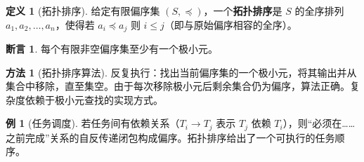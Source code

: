 \documentclass[UTF8,11pt,a4paper]{ctexbook}   %
\theoremstyle{definition}
\newtheorem{definition}{定义}[section]
\newtheorem{example}{例}[section]
\newtheorem{method}{方法}[section]
\newtheorem{proposition}{断言}[section]
\begin{document}
\begin{definition}[拓扑排序]
给定有限偏序集 $(S,\preceq)$，一个\textbf{拓扑排序}是 $S$ 的全序排列 $a_1,a_2,\dots,a_n$，使得若 $a_i \preceq a_j$ 则 $i \leq j$（即与原始偏序相容的全序）。
\end{definition}

\begin{proposition}
每个有限非空偏序集至少有一个极小元。
\end{proposition}

\begin{method}[拓扑排序算法]
反复执行：找出当前偏序集的一个极小元，将其输出并从集合中移除，直至集空。由于每次移除极小元后剩余集合仍为偏序，算法正确。复杂度依赖于极小元查找的实现方式。
\end{method}

\begin{example}[任务调度]
若任务间有依赖关系（$T_i \to T_j$ 表示 $T_j$ 依赖 $T_i$），则“必须在……之前完成”关系的自反传递闭包构成偏序。拓扑排序给出了一个可执行的任务顺序。
\end{example}

\newpage
\end{document}
